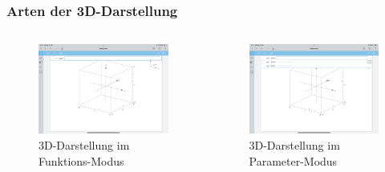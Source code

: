 \documentclass[10pt,ngerman]{beamer}
\begin{document}
\begin{frame}
	\frametitle{Arten der 3D-Darstellung}

	\begin{columns}
		\begin{column}{0.5\textwidth}
			\begin{figure}
				\centering
				\includegraphics[width=\textwidth]{IMG_1444.png}
				\caption{3D-Darstellung im Funktions-Modus}
				\label{fig:Funktions-Modus}
			\end{figure}
		\end{column}

		\begin{column}{0.5\textwidth}
			\begin{figure}
				\centering
				\includegraphics[width=\textwidth]{IMG_1445.png}
				\caption{3D-Darstellung im Parameter-Modus}
				\label{fig:Parameter-Modus}
			\end{figure}
		\end{column}
	\end{columns}
\end{frame}
\end{document}
